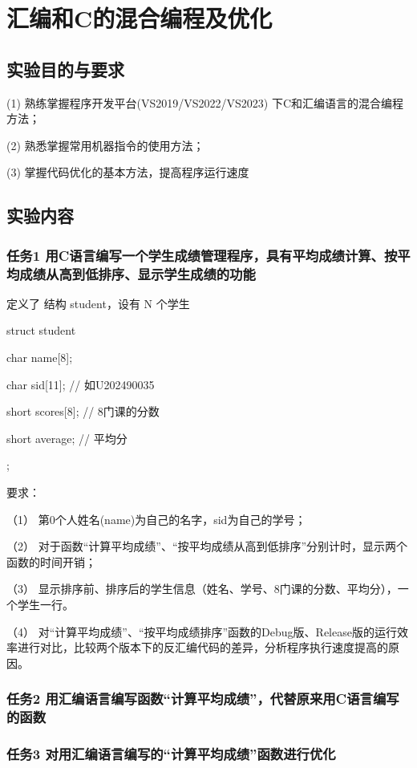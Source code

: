 \documentclass[supercite]{Experimental_Report}
\theoremstyle{definition}
\begin{document}
	\section{汇编和C的混合编程及优化}
	\subsection{实验目的与要求}
	(1) 熟练掌握程序开发平台(VS2019/VS2022/VS2023) 下C和汇编语言的混合编程方法；
	
	(2) 熟悉掌握常用机器指令的使用方法；
	
	(3) 掌握代码优化的基本方法，提高程序运行速度
	
	\subsection{实验内容}
	\subsubsection{任务1 用C语言编写一个学生成绩管理程序，具有平均成绩计算、按平均成绩从高到低排序、显示学生成绩的功能}
	定义了 结构 student，设有 N 个学生 
	
	struct student {
		
		char  name[8];
		
		char  sid[11];   //  如U202490035
		
		short  scores[8]; //  8门课的分数
		
		short  average;  //  平均分
		
	};
	
	要求：
	
	（1）	第0个人姓名(name)为自己的名字，sid为自己的学号； 
	
	（2）	对于函数“计算平均成绩”、“按平均成绩从高到低排序”分别计时，显示两个函数的时间开销；
	
	（3）	显示排序前、排序后的学生信息（姓名、学号、8门课的分数、平均分），一个学生一行。
	
	（4）	对“计算平均成绩”、“按平均成绩排序”函数的Debug版、Release版的运行效率进行对比，比较两个版本下的反汇编代码的差异，分析程序执行速度提高的原因。 
	
	\subsubsection{任务2  用汇编语言编写函数“计算平均成绩”，代替原来用C语言编写的函数}
	\subsubsection{任务3  对用汇编语言编写的“计算平均成绩”函数进行优化}
\end{document}
